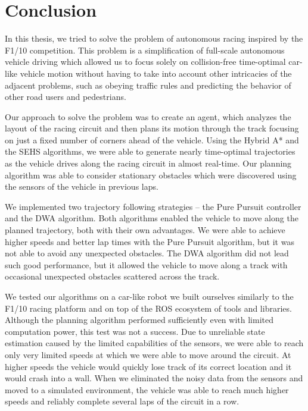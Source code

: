 \chapter*{Conclusion}

In this thesis, we tried to solve the problem of autonomous racing inspired by the F1/10 competition. This problem is a simplification of full-scale autonomous vehicle driving which allowed us to focus solely on collision-free time-optimal car-like vehicle motion without having to take into account other intricacies of the adjacent problems, such as obeying traffic rules and predicting the behavior of other road users and pedestrians.

Our approach to solve the problem was to create an agent, which analyzes the layout of the racing circuit and then plans its motion through the track focusing on just a fixed number of corners ahead of the vehicle. Using the Hybrid A* and the \gls{SEHS} algorithms, we were able to generate nearly time-optimal trajectories as the vehicle drives along the racing circuit in almost real-time. Our planning algorithm was able to consider stationary obstacles which were discovered using the sensors of the vehicle in previous laps.

We implemented two trajectory following strategies – the Pure Pursuit controller and the \gls{DWA} algorithm. Both algorithms enabled the vehicle to move along the planned trajectory, both with their own advantages. We were able to achieve higher speeds and better lap times with the Pure Pursuit algorithm, but it was not able to avoid any unexpected obstacles. The \gls*{DWA} algorithm did not lead such good performance, but it allowed the vehicle to move along a track with occasional unexpected obstacles scattered across the track.

We tested our algorithms on a car-like robot we built ourselves similarly to the F1/10 racing platform and on top of the \gls{ROS} ecosystem of tools and libraries. Although the planning algorithm performed sufficiently even with limited computation power, this test was not a success. Due to unreliable state estimation caused by the limited capabilities of the sensors, we were able to reach only very limited speeds at which we were able to move around the circuit. At higher speeds the vehicle would quickly lose track of its correct location and it would crash into a wall. When we eliminated the noisy data from the sensors and moved to a simulated environment, the vehicle was able to reach much higher speeds and reliably complete several laps of the circuit in a row.

